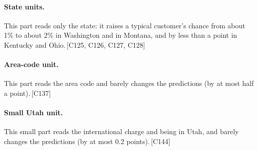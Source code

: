 \documentclass[a4paper,10pt]{article}
\newif\ifreviewmarks
\newcommand{\reviewrule}{\noindent{\color{BrickRed}\rule{\linewidth}{0.8pt}}}
\newenvironment{drafted}[1][]{%
  \ifreviewmarks\par\addvspace{\medskipamount}\reviewrule\par\nopagebreak
  \noindent{\color{BrickRed}\sffamily\footnotesize\textbf{Thesis Draft}\quad #1\hfill review}\par\nopagebreak\smallskip\fi}{%
  \ifreviewmarks\par\smallskip\noindent{\color{BrickRed}\sffamily\footnotesize end of thesis draft}\par\nopagebreak\reviewrule\par\medskip\fi}
\begin{document}
\begin{drafted}[plain-language layer: churn100-s2-c2]
\paragraph{State units.} This part reads only the state: it raises a typical customer's chance from about 1\% to about 2\% in Washington and in Montana, and by less than a point in Kentucky and Ohio.\,{\scriptsize\textcolor{NavyBlue}{[C125, C126, C127, C128]}}
\paragraph{Area-code unit.} This part reads the area code and barely changes the predictions (by at most half a point).\,{\scriptsize\textcolor{NavyBlue}{[C137]}}
\paragraph{Small Utah unit.} This small part reads the international charge and being in Utah, and barely changes the predictions (by at most 0.2 points).\,{\scriptsize\textcolor{NavyBlue}{[C144]}}

\end{drafted}
\end{document}
